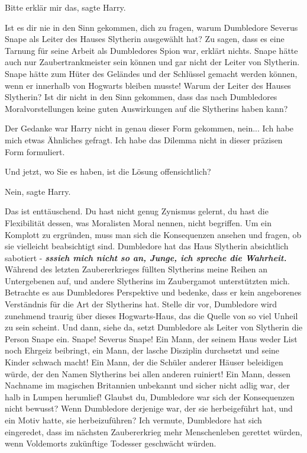 \glqq{}Bitte erklär mir das\grqq{}, sagte Harry.

\glqq{}Ist es dir nie in den Sinn gekommen, dich zu fragen, warum Dumbledore
Severus Snape als Leiter des Hauses Slytherin ausgewählt hat? Zu sagen, dass es
eine Tarnung für seine Arbeit als Dumbledores Spion war, erklärt nichts. Snape
hätte auch nur Zaubertrankmeister sein können und gar nicht der Leiter von
Slytherin. Snape hätte zum Hüter des Geländes und der Schlüssel gemacht werden
können, wenn er innerhalb von Hogwarts bleiben musste! Warum der Leiter des
Hauses Slytherin? Ist dir nicht in den Sinn gekommen, dass das nach Dumbledores
Moralvorstellungen keine guten Auswirkungen auf die Slytherins haben kann?\grqq{}

Der Gedanke war Harry nicht in genau dieser Form gekommen, nein... \glqq{}Ich
habe mich etwas Ähnliches gefragt. Ich habe das Dilemma nicht in dieser präzisen
Form formuliert.\grqq{}

\glqq{}Und jetzt, wo Sie es haben, ist die Lösung offensichtlich?\grqq{}

\glqq{}Nein\grqq{}, sagte Harry.

\glqq{}Das ist enttäuschend. Du hast nicht genug Zynismus gelernt, du hast die
Flexibilität dessen, was Moralisten Moral nennen, nicht begriffen. Um ein
Komplott zu ergründen, muss man sich die Konsequenzen ansehen und fragen, ob sie
vielleicht beabsichtigt sind. Dumbledore hat das Haus Slytherin absichtlich
sabotiert - \textbf{\emph{sssieh mich nicht so an, Junge, ich spreche die
Wahrheit.}} Während des letzten Zaubererkrieges füllten Slytherins meine Reihen
an Untergebenen auf, und andere Slytherins im Zaubergamot unterstützten mich.
Betrachte es aus Dumbledores Perspektive und bedenke, dass er kein angeborenes
Verständnis für die Art der Slytherins hat. Stelle dir vor, Dumbledore wird
zunehmend traurig über dieses Hogwarts-Haus, das die Quelle von so viel Unheil
zu sein scheint. Und dann, siehe da, setzt Dumbledore als Leiter von Slytherin
die Person Snape ein. Snape! Severus Snape! Ein Mann, der seinem Haus weder List
noch Ehrgeiz beibringt, ein Mann, der lasche Disziplin durchsetzt und seine
Kinder schwach macht! Ein Mann, der die Schüler anderer Häuser beleidigen würde,
der den Namen Slytherins bei allen anderen ruiniert! Ein Mann, dessen Nachname
im magischen Britannien unbekannt und sicher nicht adlig war, der halb in Lumpen
herumlief! Glaubst du, Dumbledore war sich der Konsequenzen nicht bewusst? Wenn
Dumbledore derjenige war, der sie herbeigeführt hat, und ein Motiv hatte, sie
herbeizuführen? Ich vermute, Dumbledore hat sich eingeredet, dass im nächsten
Zaubererkrieg mehr Menschenleben gerettet würden, wenn Voldemorts zukünftige
Todesser geschwächt würden.\grqq{}

